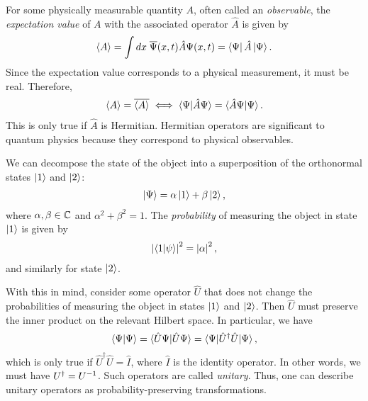 For some physically measurable quantity $A$, often called an \textit{observable}, the \textit{expectation value} of $A$ with the associated operator $\hat{A}$ is given by
\begin{align}
    \braket{A} = \int dx\; \overline{\Psi}(x,t)\hat{A}\Psi(x,t) = \bra{\Psi}\hat{A}\ket{\Psi}.
\end{align}
Since the expectation value corresponds to a physical measurement, it must be real. Therefore,
\begin{align}
    \braket{A} = \overline{\braket{A}} \iff \braket{\Psi|\hat{A}\Psi} = \braket{\hat{A}\Psi|\Psi}.
\end{align}
This is only true if $\hat{A}$ is Hermitian. Hermitian operators are significant to quantum physics because they correspond to physical observables. 

We can decompose the state of the object into a superposition of the orthonormal states $\ket{1}$ and $\ket{2}$:
\begin{align}
    \ket{\Psi} = \alpha\ket{1} + \beta\ket{2},
\end{align}
where $\alpha,\beta\in\mathbb{C}$ and $\alpha^2+\beta^2=1$. The \textit{probability} of measuring the object in state $\ket{1}$ is given by
\begin{align}
    \left|\braket{1|\psi}\right|^2 = \left|\alpha\right|^2,
\end{align}
and similarly for state $\ket{2}$.

With this in mind, consider some operator $\hat{U}$ that does not change the probabilities of measuring the object in states $\ket{1}$ and $\ket{2}$. Then $\hat{U}$ must preserve the inner product on the relevant Hilbert space. In particular, we have
\begin{align}
    \braket{\Psi|\Psi} = \braket{\hat{U}\Psi|\hat{U}\Psi} = \braket{\Psi|\hat{U}^\dagger\hat{U}|\Psi},
\end{align}
which is only true if $\hat{U}^\dagger\hat{U}=\hat{I}$, where $\hat{I}$ is the identity operator. In other words, we must have $U^\dagger = { U }^{-1}$. Such operators are called \textit{unitary}. Thus, one can describe unitary operators as probability-preserving transformations.

